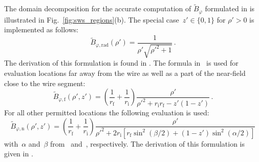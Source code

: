 The domain decomposition for the accurate computation of $\tilde{B}_\varphi$
formulated in  is illustrated in Fig.~\ref{fig:sws_regions}(b).
The special case~$z' \in \{0, 1\}$ for $\rho'>0$ is implemented as follows:
\begin{equation}
  \tilde{B}_{\varphi,\mathrm{rad}} (\rho') = \frac{1}{\rho' \sqrt{{\rho'}^2 + 1}} \label{eqn:sws_B_phi_rad} \, .
\end{equation}
The derivation of this formulation is found in .
The formula in~ is used for evaluation locations far away from the wire
as well as a part of the near-field close to the wire segment:
\begin{equation}
  \tilde{B}_{\varphi,\mathrm{f}} (\rho', z')
  = \left(\frac{1}{r_\mathrm{f}} + \frac{1}{r_\mathrm{i}} \right)
    \frac{\rho'}{{\rho'}^2 + r_\mathrm{i} r_\mathrm{f} - z' (1 - z')} \, .
\end{equation}
For all other permitted locations the following evaluation is used:
\begin{equation}
  \tilde{B}_{\varphi,\mathrm{n}} (\rho', z')
  = \left(\frac{1}{r_\mathrm{f}} + \frac{1}{r_\mathrm{i}} \right)
    \frac{\rho'}
         {{\rho'}^2 + 2 r_\mathrm{i} \left[ r_\mathrm{f} \sin^2(\beta/2) + (1 - z') \sin^2(\alpha/2) \right]} \label{eqn:sws_B_phi_n}
\end{equation}
with~$\alpha$ and~$\beta$ from~ and~, respectively.
The derivation of this formulation is given in .
